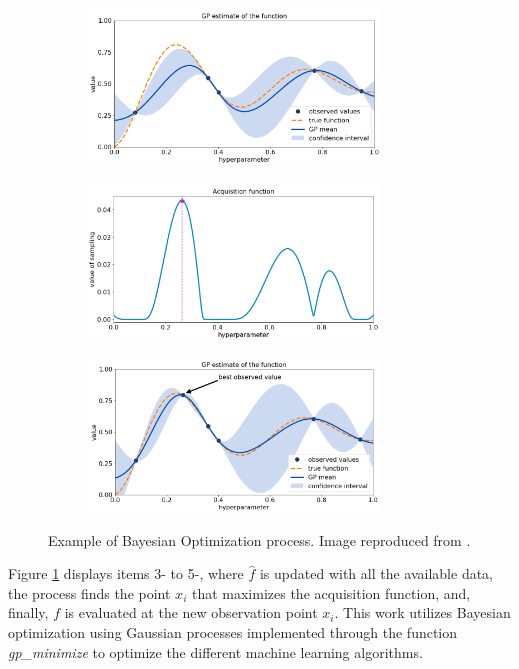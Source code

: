 \begin{figure}[htbp!] %
  \centering
  \begin{subfigure}[b]{0.49\textwidth}
    \centering
    \includegraphics[width=0.85\textwidth]{figures/BO-GP-1}
    \caption{}
  \end{subfigure}
  \hfill
  \begin{subfigure}[b]{0.49\textwidth}
    \centering
    \includegraphics[width=0.85\textwidth]{figures/BO-GP-2}
    \caption{}
  \end{subfigure}
  \par
  \begin{subfigure}[b]{0.49\textwidth}
    \centering
    \includegraphics[width=0.85\textwidth]{figures/BO-GP-3}
    \caption{}
  \end{subfigure}
  \caption{Example of Bayesian Optimization process. Image reproduced from \cite{ravikumar_lets_2018}.}
  \label{fig:3-bo}
\end{figure}

Figure \ref{fig:3-bo} displays items 3- to 5-, where $\hat{f}$ is updated with all the available data, the process finds the point $x_i$ that maximizes the acquisition function, and, finally, $f$ is evaluated at the new observation point $x_i$. 
This work utilizes Bayesian optimization using Gaussian processes implemented through the function \textit{gp\_minimize} \cite{scikit_optimize} to optimize the different machine learning algorithms.
